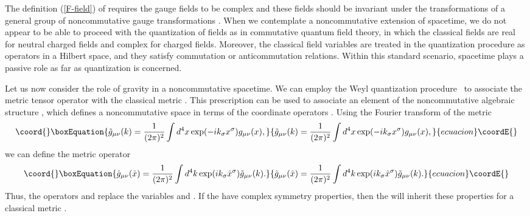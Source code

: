 \documentclass[a4paper,10pt]{article}
\begin{document}
The definition (\ref{F-field}) of \coordHE{} requires the gauge fields
to be complex and these fields should be invariant under the
transformations of a general group of noncommutative gauge transformations
\coordHE{}. When we contemplate a noncommutative extension of spacetime,
we do not appear to be able to proceed with the quantization of fields as
in commutative quantum field theory, in which the classical fields are real
for neutral charged fields and complex for charged fields. Moreover, the
classical field variables are treated in the quantization procedure as
operators in a Hilbert space, and they satisfy commutation or
anticommutation relations. Within this standard scenario, spacetime plays a
passive role as far as quantization is concerned.

Let us now consider the role of gravity in a noncommutative
spacetime. We can employ the Weyl quantization
procedure~\cite{Wess,Weyl} to associate the metric tensor
operator \coordHE{} with the classical metric
\coordHE{}. This prescription can be used to associate an
element of the noncommutative algebraic structure \coordHE{}, which
defines a noncommutative space in terms of the coordinate
operators \coordHE{}. Using the Fourier transform of the metric
\begin{equation}\coord{}\boxEquation{ {\tilde g}_{\mu\nu}(k)=\frac{1}{(2\pi)^2}\int
d^4x \exp(-ik_\sigma x^\sigma)g_{\mu\nu}(x), }{ {\tilde g}_{\mu\nu}(k)=\frac{1}{(2\pi)^2}\int
d^4x \exp(-ik_\sigma x^\sigma)g_{\mu\nu}(x), }{ecuacion}\coordE{}\end{equation}
we can define the metric operator
\begin{equation}\coord{}\boxEquation{
{\hat g}_{\mu\nu}(\hat x)=\frac{1}{(2\pi)^2}\int d^4k\exp(ik_\sigma{\hat
x}^\sigma){\tilde g}_{\mu\nu}(k).
}{
{\hat g}_{\mu\nu}(\hat x)=\frac{1}{(2\pi)^2}\int d^4k\exp(ik_\sigma{\hat
x}^\sigma){\tilde g}_{\mu\nu}(k).
}{ecuacion}\coordE{}\end{equation}
Thus, the operators \coordHE{} and \coordHE{} replace the variables
\coordHE{} and \coordHE{}. If the \coordHE{} have complex
symmetry properties, then the \coordHE{} will inherit these
properties for a classical metric \coordHE{}.
\end{document}
